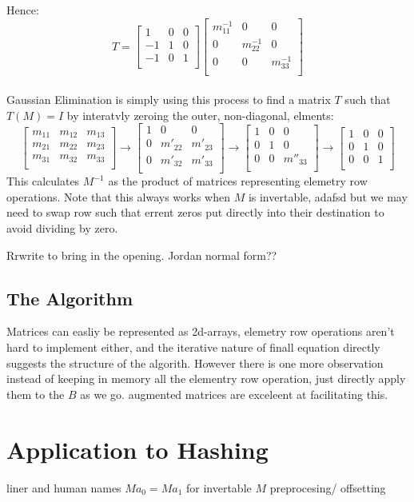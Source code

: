 Hence:
\[T =
\begin{bmatrix}
	1&0&0 \\
	-1&1&0 \\
	-1&0&1 \\
\end{bmatrix}
\begin{bmatrix}
	m_{11}^{-1}&0&0 \\
	0&m_{22}^{-1}&0 \\
	0&0&m_{33}^{-1} \\
\end{bmatrix}
\]
\\

Gaussian Elimination is simply using this process to find a matrix $T$ such that $T(M) = I$ by interatvly zeroing the outer, non-diagonal, elments:
\[
\begin{bmatrix}
	m_{11} & m_{12} & m_{13} \\
	m_{21} & m_{22} & m_{23} \\
	m_{31} & m_{32} & m_{33} \\
\end{bmatrix}
\rightarrow
\begin{bmatrix}
	1&0&0\\
	0 & m'_{22} & m'_{23} \\
	0 & m'_{32} & m'_{33} \\
\end{bmatrix}
\rightarrow
\begin{bmatrix}
	1&0&0\\
	0 & 1 & 0 \\
	0 & 0 & m''_{33} \\
\end{bmatrix}
\rightarrow
\begin{bmatrix}
	1&0&0\\
	0 & 1 & 0 \\
	0 & 0 & 1 \\
\end{bmatrix}
\]
This calculates $M^{-1}$ as the product of matrices representing elemetry row operations.
Note that this always works when $M$ is invertable, adafsd 
but we may need to swap row such that errent zeros put directly into their destination to avoid dividing by zero.

Rrwrite to bring in the opening.
Jordan normal form??

\subsection{The Algorithm}
Matrices can easliy be represented as 2d-arrays,
elemetry row operations aren't hard to implement either,
and the iterative nature of finall equation directly suggests the structure of the algorith.
However there is one more observation 
instead of keeping in memory all the elementry row operation, just directly apply them to the $B$ as we go.
augmented matrices are exceleent at facilitating this.
\section{Application to Hashing}
liner and human names
$Ma_0 = Ma_1$ for invertable $M$
preprocesing/ offsetting

